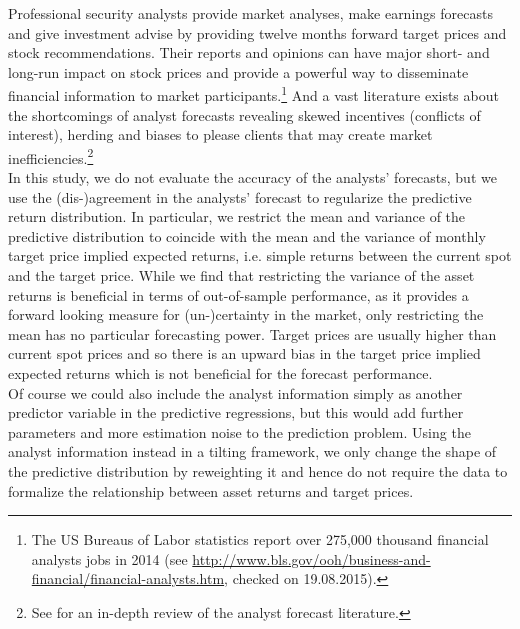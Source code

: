 %
\indent Professional security analysts provide market analyses, make earnings forecasts and give investment advise by providing twelve months forward target prices and stock recommendations. Their reports and opinions can have major short- and long-run impact on stock prices \citep[e.g.][]{irvine2003} and provide a powerful way to disseminate financial information to market participants.\footnote{The US Bureaus of Labor statistics report over 275,000 thousand financial analysts jobs in 2014 (see \url{http://www.bls.gov/ooh/business-and-financial/financial-analysts.htm}, checked on 19.08.2015).} And a vast literature exists about the shortcomings of analyst forecasts revealing skewed incentives (conflicts of interest), herding and biases to please clients that may create market inefficiencies.\footnote{See  \cite{ramnath2008} for an in-depth review of the analyst forecast literature.}\\
%
\indent In this study, we do not evaluate the accuracy of the analysts' forecasts, but we use the (dis-)agreement in the analysts' forecast to regularize the predictive return distribution. In particular, we restrict the mean and variance of the predictive distribution to coincide with the mean and the variance of monthly target price implied expected returns, i.e. simple returns between the current spot and the target price. While we find that restricting the variance of the asset returns is beneficial in terms of out-of-sample performance, as it provides a forward looking measure for (un-)certainty in the market, only restricting the mean has no particular forecasting power. Target prices are usually higher than current spot prices and so there is an upward bias in the target price implied expected returns which is not beneficial for the forecast performance.\\
%
\indent Of course we could also include the analyst information simply as another predictor variable in the predictive regressions, but this would add further parameters and more estimation noise to the prediction problem. Using the analyst information instead in a tilting framework, we only change the shape of the predictive distribution by reweighting it and hence do not require the data to formalize the relationship between asset returns and target prices.\\
%
